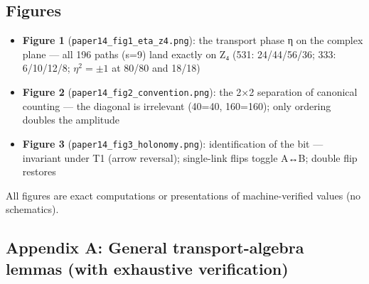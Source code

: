 \documentclass[
]{ltjsarticle}
\providecommand{\tightlist}{%
  \setlength{\itemsep}{0pt}\setlength{\parskip}{0pt}}
\begin{document}
\subsection{Figures}\label{figures}

\begin{itemize}
\tightlist
\item
  \textbf{Figure 1} (\texttt{paper14\_fig1\_eta\_z4.png}): the transport
  phase η on the complex plane --- all 196 paths (s=9) land exactly on
  Z₄ (531: 24/44/56/36; 333: 6/10/12/8; \(\eta^2=\pm1\) at 80/80 and
  18/18)
\item
  \textbf{Figure 2} (\texttt{paper14\_fig2\_convention.png}): the 2×2
  separation of canonical counting --- the diagonal is irrelevant
  (40=40, 160=160); only ordering doubles the amplitude
\item
  \textbf{Figure 3} (\texttt{paper14\_fig3\_holonomy.png}):
  identification of the bit --- invariant under T1 (arrow reversal);
  single-link flips toggle A↔B; double flip restores
\end{itemize}

All figures are exact computations or presentations of machine-verified
values (no schematics).

\subsection{Appendix A: General transport-algebra lemmas (with
exhaustive
verification)}\label{appendix-a-general-transport-algebra-lemmas-with-exhaustive-verification}
\end{document}
